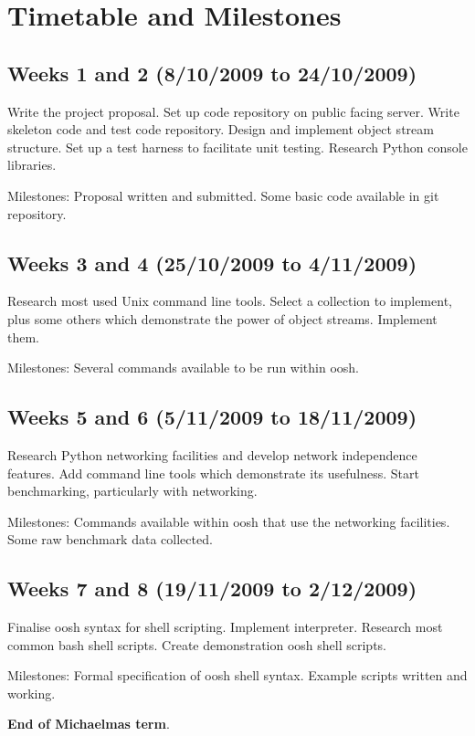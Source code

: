 \documentclass[12pt]{article}
\begin{document}
\section*{Timetable and Milestones}

\subsection*{Weeks 1 and 2 (8/10/2009 to 24/10/2009)}
Write the project proposal. Set up code repository on public facing
server. Write skeleton code and test code repository. Design and
implement object stream structure. Set up a test harness to facilitate
unit testing. Research Python console libraries.

Milestones: Proposal written and submitted. Some basic code available
in git repository.

\subsection*{Weeks 3 and 4 (25/10/2009 to 4/11/2009)}
Research most used Unix command line tools. Select a collection to
implement, plus some others which demonstrate the power of object
streams. Implement them.

Milestones: Several commands available to be run within oosh.

\subsection*{Weeks 5 and 6 (5/11/2009 to 18/11/2009)}
Research Python networking facilities and develop network independence
features. Add command line tools which demonstrate its
usefulness. Start benchmarking, particularly with networking.

Milestones: Commands available within oosh that use the networking
facilities. Some raw benchmark data collected.

\subsection*{Weeks 7 and 8 (19/11/2009 to 2/12/2009)}
Finalise oosh syntax for shell scripting. Implement
interpreter. Research most common bash shell scripts. Create
demonstration oosh shell scripts.

Milestones: Formal specification of oosh shell syntax. Example scripts
written and working.

{\bf End of Michaelmas term}.
\end{document}
